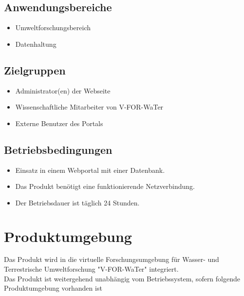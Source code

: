 \documentclass[parskip=full,11pt]{scrartcl}
\begin{document}
\subsection{Anwendungsbereiche}
\begin{itemize}[itemsep=0pt]
\item Umweltforschungsbereich
\item Datenhaltung
\end{itemize}

\subsection{Zielgruppen}
\begin{itemize}[itemsep=0pt]
\item Administrator(en) der Webseite %
\item Wissenschaftliche Mitarbeiter von V-FOR-WaTer
\item Externe Benutzer des Portals
\end{itemize}

\subsection{Betriebsbedingungen}
\begin{itemize}[itemsep=0pt]
\item Einsatz in einem Webportal mit einer Datenbank.
\item Das Produkt benötigt eine funktionierende Netzverbindung.
\item Der Betriebsdauer ist täglich 24 Stunden.
\end{itemize}


\section{Produktumgebung}
Das Produkt wird in die virtuelle Forschungsumgebung für Wasser- und Terrestrische Umweltforschung "V-FOR-WaTer" integriert.\\
Das Produkt ist weitergehend unabhängig vom Betriebssystem, sofern folgende Produktumgebung vorhanden ist
\end{document}
